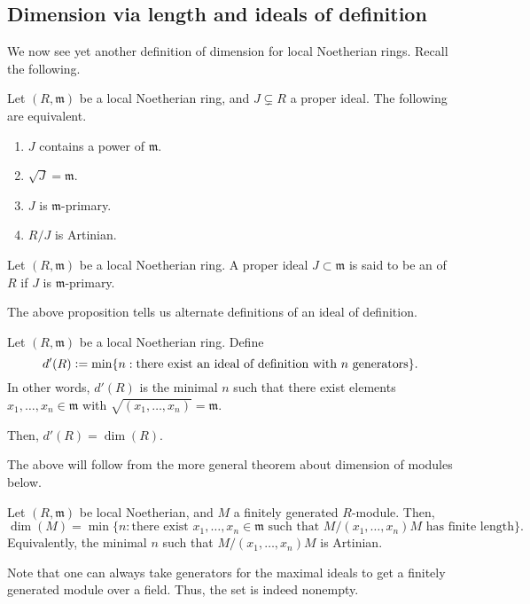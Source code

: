 \documentclass[12pt]{article}
\begin{document}
\subsection{Dimension via length and ideals of definition}

We now see yet another definition of dimension for local Noetherian rings. Recall the following.

\begin{prop}
	Let $(R, \mathfrak{m})$ be a local Noetherian ring, and $J \subsetneq R$ a proper ideal. The following are equivalent.
	\begin{enumerate}
		\item $J$ contains a power of $\mathfrak{m}$.
		\item $\sqrt{J} = \mathfrak{m}$.
		\item $J$ is $\mathfrak{m}$-primary.
		\item $R/J$ is Artinian.
	\end{enumerate}
\end{prop}

\begin{defn}
	Let $(R, \mathfrak{m})$ be a local Noetherian ring. A proper ideal $J \subset \mathfrak{m}$ is said to be an  of $R$ if $J$ is $\mathfrak{m}$-primary.
\end{defn}
The above proposition tells us alternate definitions of an ideal of definition.

\begin{prop}
	Let $(R, \mathfrak{m})$ be a local Noetherian ring. Define
	\begin{equation*} 
		d'(R) \vcentcolon= \min\{n : \text{there exist an ideal of definition with $n$ generators}\}.
	\end{equation*}
	In other words, $d'(R)$ is the minimal $n$ such that there exist elements $x_{1}, \ldots, x_{n} \in \mathfrak{m}$ with $\sqrt{(x_{1}, \ldots, x_{n})} = \mathfrak{m}$.

	Then, $d'(R) = \dim(R)$.
\end{prop}

The above will follow from the more general theorem about dimension of modules below.

\begin{thm}
	Let $(R, \mathfrak{m})$ be local Noetherian, and $M$ a finitely generated $R$-module. Then,
	\begin{equation*} 
		\dim(M) = \min\{n : \text{there exist $x_{1}, \ldots, x_{n} \in \mathfrak{m}$ such that $M/(x_{1}, \ldots, x_{n})M$ has finite length}\}.
	\end{equation*}
	Equivalently, the minimal $n$ such that $M/(x_{1}, \ldots, x_{n})M$ is Artinian.
\end{thm}
Note that one can always take generators for the maximal ideals to get a finitely generated module over a field. Thus, the set is indeed nonempty.
\end{document}
